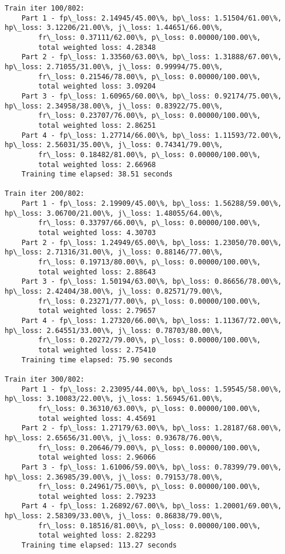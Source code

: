 \documentclass[11pt]{article}
\begin{document}
\begin{Verbatim}[commandchars=\\\{\}]
Train iter 100/802:
	Part 1 - fp\_loss: 2.14945/45.00\%, bp\_loss: 1.51504/61.00\%, hp\_loss: 3.12206/21.00\%, j\_loss: 1.44651/66.00\%, 
		fr\_loss: 0.37111/62.00\%, p\_loss: 0.00000/100.00\%, 
		total weighted loss: 4.28348
	Part 2 - fp\_loss: 1.33560/63.00\%, bp\_loss: 1.31888/67.00\%, hp\_loss: 2.71055/31.00\%, j\_loss: 0.99994/75.00\%, 
		fr\_loss: 0.21546/78.00\%, p\_loss: 0.00000/100.00\%, 
		total weighted loss: 3.09204
	Part 3 - fp\_loss: 1.60965/60.00\%, bp\_loss: 0.92174/75.00\%, hp\_loss: 2.34958/38.00\%, j\_loss: 0.83922/75.00\%, 
		fr\_loss: 0.23707/76.00\%, p\_loss: 0.00000/100.00\%, 
		total weighted loss: 2.86251
	Part 4 - fp\_loss: 1.27714/66.00\%, bp\_loss: 1.11593/72.00\%, hp\_loss: 2.56031/35.00\%, j\_loss: 0.74341/79.00\%, 
		fr\_loss: 0.18482/81.00\%, p\_loss: 0.00000/100.00\%, 
		total weighted loss: 2.66968
	Training time elapsed: 38.51 seconds

Train iter 200/802:
	Part 1 - fp\_loss: 2.19909/45.00\%, bp\_loss: 1.56288/59.00\%, hp\_loss: 3.06700/21.00\%, j\_loss: 1.48055/64.00\%, 
		fr\_loss: 0.33797/66.00\%, p\_loss: 0.00000/100.00\%, 
		total weighted loss: 4.30703
	Part 2 - fp\_loss: 1.24949/65.00\%, bp\_loss: 1.23050/70.00\%, hp\_loss: 2.71316/31.00\%, j\_loss: 0.88146/77.00\%, 
		fr\_loss: 0.19713/80.00\%, p\_loss: 0.00000/100.00\%, 
		total weighted loss: 2.88643
	Part 3 - fp\_loss: 1.50194/63.00\%, bp\_loss: 0.86656/78.00\%, hp\_loss: 2.42404/38.00\%, j\_loss: 0.82571/79.00\%, 
		fr\_loss: 0.23271/77.00\%, p\_loss: 0.00000/100.00\%, 
		total weighted loss: 2.79657
	Part 4 - fp\_loss: 1.27320/66.00\%, bp\_loss: 1.11367/72.00\%, hp\_loss: 2.64551/33.00\%, j\_loss: 0.78703/80.00\%, 
		fr\_loss: 0.20272/79.00\%, p\_loss: 0.00000/100.00\%, 
		total weighted loss: 2.75410
	Training time elapsed: 75.90 seconds

Train iter 300/802:
	Part 1 - fp\_loss: 2.23095/44.00\%, bp\_loss: 1.59545/58.00\%, hp\_loss: 3.10083/22.00\%, j\_loss: 1.56945/61.00\%, 
		fr\_loss: 0.36310/63.00\%, p\_loss: 0.00000/100.00\%, 
		total weighted loss: 4.45691
	Part 2 - fp\_loss: 1.27179/63.00\%, bp\_loss: 1.28187/68.00\%, hp\_loss: 2.65656/31.00\%, j\_loss: 0.93678/76.00\%, 
		fr\_loss: 0.20646/79.00\%, p\_loss: 0.00000/100.00\%, 
		total weighted loss: 2.96066
	Part 3 - fp\_loss: 1.61006/59.00\%, bp\_loss: 0.78399/79.00\%, hp\_loss: 2.36985/39.00\%, j\_loss: 0.79153/78.00\%, 
		fr\_loss: 0.24961/75.00\%, p\_loss: 0.00000/100.00\%, 
		total weighted loss: 2.79233
	Part 4 - fp\_loss: 1.26892/67.00\%, bp\_loss: 1.20001/69.00\%, hp\_loss: 2.58309/33.00\%, j\_loss: 0.86838/79.00\%, 
		fr\_loss: 0.18516/81.00\%, p\_loss: 0.00000/100.00\%, 
		total weighted loss: 2.82293
	Training time elapsed: 113.27 seconds


\end{Verbatim}
\end{document}
